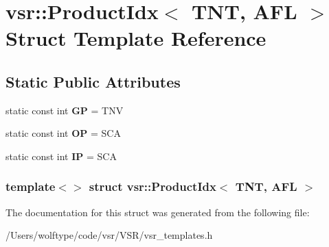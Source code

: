 \hypertarget{structvsr_1_1_product_idx_3_01_t_n_t_00_01_a_f_l_01_4}{\section{vsr\-:\-:Product\-Idx$<$ T\-N\-T, A\-F\-L $>$ Struct Template Reference}
\label{structvsr_1_1_product_idx_3_01_t_n_t_00_01_a_f_l_01_4}
}
\subsection*{Static Public Attributes}
\begin{DoxyCompactItemize}
\item 
\hypertarget{structvsr_1_1_product_idx_3_01_t_n_t_00_01_a_f_l_01_4_ac1cfb1ec92af8e8d430b4933d00629dc}{static const int {\bfseries G\-P} = T\-N\-V}\label{structvsr_1_1_product_idx_3_01_t_n_t_00_01_a_f_l_01_4_ac1cfb1ec92af8e8d430b4933d00629dc}

\item 
\hypertarget{structvsr_1_1_product_idx_3_01_t_n_t_00_01_a_f_l_01_4_a6b8a67e6b20962045e5e61c0714ea372}{static const int {\bfseries O\-P} = S\-C\-A}\label{structvsr_1_1_product_idx_3_01_t_n_t_00_01_a_f_l_01_4_a6b8a67e6b20962045e5e61c0714ea372}

\item 
\hypertarget{structvsr_1_1_product_idx_3_01_t_n_t_00_01_a_f_l_01_4_a4593d593c5de5a7e29c8e1d9556207d1}{static const int {\bfseries I\-P} = S\-C\-A}\label{structvsr_1_1_product_idx_3_01_t_n_t_00_01_a_f_l_01_4_a4593d593c5de5a7e29c8e1d9556207d1}

\end{DoxyCompactItemize}
\subsubsection*{template$<$$>$ struct vsr\-::\-Product\-Idx$<$ T\-N\-T, A\-F\-L $>$}



The documentation for this struct was generated from the following file\-:\begin{DoxyCompactItemize}
\item 
/\-Users/wolftype/code/vsr/\-V\-S\-R/vsr\-\_\-templates.\-h\end{DoxyCompactItemize}
